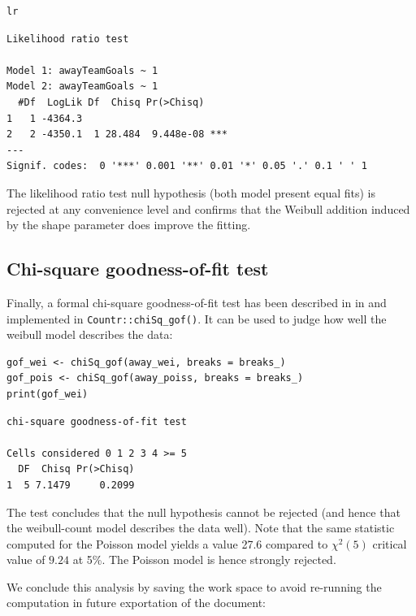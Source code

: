 \documentclass[a4paper,twoside,11pt]{article}
\begin{document}
\begin{verbatim}
lr
\end{verbatim}

\begin{verbatim}
Likelihood ratio test

Model 1: awayTeamGoals ~ 1
Model 2: awayTeamGoals ~ 1
  #Df  LogLik Df  Chisq Pr(>Chisq)    
1   1 -4364.3                         
2   2 -4350.1  1 28.484  9.448e-08 ***
---
Signif. codes:  0 '***' 0.001 '**' 0.01 '*' 0.05 '.' 0.1 ' ' 1
\end{verbatim}




The likelihood ratio test null hypothesis (both model present equal fits) is
rejected at any convenience level and confirms that the Weibull addition
induced by the shape parameter does improve the fitting.

\subsection{Chi-square goodness-of-fit test}
\label{sec:org2f252d8}
Finally, a formal chi-square goodness-of-fit test has been described in in
\citet[Section 5.3.4]{cameron2013regression} and implemented in 
\texttt{Countr::chiSq\_gof()}. It can be used to judge how well the weibull model
describes the data:
\begin{verbatim}
gof_wei <- chiSq_gof(away_wei, breaks = breaks_)
gof_pois <- chiSq_gof(away_poiss, breaks = breaks_)
print(gof_wei)
\end{verbatim}

\begin{verbatim}
chi-square goodness-of-fit test

Cells considered 0 1 2 3 4 >= 5
  DF  Chisq Pr(>Chisq)
1  5 7.1479     0.2099
\end{verbatim}


The test concludes that the null hypothesis cannot be rejected (and hence that
the weibull-count model describes the data well). Note that the same statistic
computed for the Poisson model yields a value 27.6 compared to \(\chi^2(5)\) critical value of
\(9.24\) at 5\%. The Poisson model is hence strongly rejected.

\label{sec:orgd3c8485}
We conclude this analysis by saving the work space to avoid re-running the
computation in future exportation of the document:
\label{sec:orgb782043}


\end{document}
